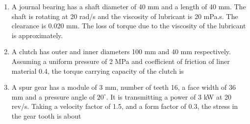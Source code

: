 \documentclass[journal,12pt,onecolumn]{IEEEtran}
\begin{document}
\begin{enumerate}
    \item A journal bearing has a shaft diameter of 40 mm and a length of 40 mm. The shaft is rotating at 20 rad/s and the viscosity of lubricant is 20 mPa.s. The clearance is 0.020 mm. The loss of torque due to the viscosity of the lubricant is approximately.\\

          \begin{enumerate}
          \end{enumerate}

    \item A clutch has outer and inner diameters 100 mm and 40 mm respectively. Assuming a uniform pressure of 2 MPa and coefficient of friction of liner material 0.4, the torque carrying capacity of the clutch is\\

          \begin{enumerate}
          \end{enumerate}

    \item A spur gear has a module of 3 mm, number of teeth 16, a face width of 36 mm and a pressure angle of $20^\circ$. It is transmitting a power of 3 kW at 20 rev/s. Taking a velocity factor of 1.5, and a form factor of 0.3, the stress in the gear tooth is about\\

          \begin{enumerate}
          \end{enumerate}


\end{enumerate}
\end{document}
